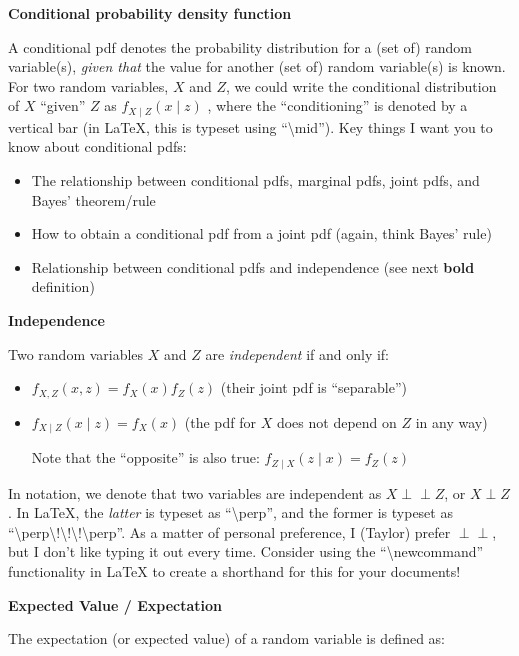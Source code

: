 \documentclass[
  letterpaper,
  DIV=11,
  numbers=noendperiod]{scrreprt}
\begin{document}
\textbf{Conditional probability density function}

A conditional pdf denotes the probability distribution for a (set of)
random variable(s), \emph{given that} the value for another (set of)
random variable(s) is known. For two random variables, \(X\) and \(Z\),
we could write the conditional distribution of \(X\) ``given'' \(Z\) as
\(f_{X \mid Z}(x \mid z)\) , where the ``conditioning'' is denoted by a
vertical bar (in LaTeX, this is typeset using ``\textbackslash mid'').
Key things I want you to know about conditional pdfs:

\begin{itemize}
\item
  The relationship between conditional pdfs, marginal pdfs, joint pdfs,
  and Bayes' theorem/rule
\item
  How to obtain a conditional pdf from a joint pdf (again, think Bayes'
  rule)
\item
  Relationship between conditional pdfs and independence (see next
  \textbf{bold} definition)
\end{itemize}

\textbf{Independence}

Two random variables \(X\) and \(Z\) are \emph{independent} if and only
if:

\begin{itemize}
\item
  \(f_{X,Z}(x,z) = f_X(x) f_Z(z)\) (their joint pdf is ``separable'')
\item
  \(f_{X\mid Z}(x\mid z) = f_X(x)\) (the pdf for \(X\) does not depend
  on \(Z\) in any way)

  Note that the ``opposite'' is also true:
  \(f_{Z\mid X}(z\mid x) = f_Z(z)\)
\end{itemize}

In notation, we denote that two variables are independent as
\(X \perp\!\!\!\perp Z\), or \(X \perp Z\). In LaTeX, the \emph{latter}
is typeset as ``\textbackslash perp'', and the former is typeset as
``\textbackslash perp\textbackslash!\textbackslash!\textbackslash!\textbackslash perp''.
As a matter of personal preference, I (Taylor) prefer
\(\perp\!\!\!\perp\), but I don't like typing it out every time.
Consider using the ``\textbackslash newcommand'' functionality in LaTeX
to create a shorthand for this for your documents!

\textbf{Expected Value / Expectation}

The expectation (or expected value) of a random variable is defined as:
\end{document}
